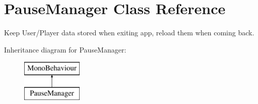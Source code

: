 \hypertarget{class_pause_manager}{}\section{Pause\+Manager Class Reference}
\label{class_pause_manager}


Keep User/\+Player data stored when exiting app, reload them when coming back.  


Inheritance diagram for Pause\+Manager\+:\begin{figure}[H]
\begin{center}
\leavevmode
\includegraphics[height=2.000000cm]{class_pause_manager}
\end{center}
\end{figure}
